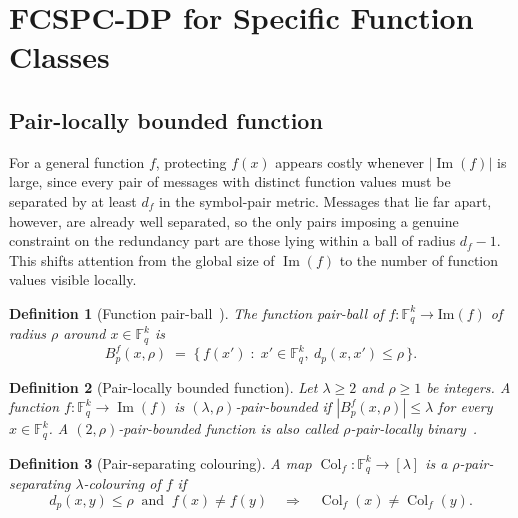 \documentclass[11pt,draftclsnofoot,journal,onecolumn]{IEEEtran}
\newtheorem{definition}{Definition}
\begin{document}
\section{FCSPC-DP for Specific Function Classes }\label{sec:classes}
    \subsection{Pair-locally bounded function}

    For a general function $f$, protecting $f(x)$ appears costly whenever $|\operatorname{Im}(f)|$ is large, since every pair of messages with distinct function values must be separated by at least $d_f$ in the symbol-pair metric. Messages that lie far apart, however, are already well separated, so the only pairs imposing a genuine constraint on the redundancy part are those lying within a ball of radius $d_f-1$. This shifts attention from the global size of $\operatorname{Im}(f)$ to the number of function values visible locally.

    \begin{definition}[Function pair-ball~\cite{xia2024function}]
    \label{def:function-pair-ball}
    The \emph{function pair-ball} of $f : \mathbb{F}_q^k \to \mathrm{Im}(f)$ of radius $\rho$ around $x \in \mathbb{F}_q^k$ is
    \[
        B^f_p(x,\rho) \;=\; \bigl\{\, f(x') \;:\; x' \in \mathbb{F}_q^k,\ d_p(x,x') \le \rho \,\bigr\}.
    \]
    \end{definition}

    \begin{definition}[Pair-locally bounded function]
    \label{def:pair-bounded}
    Let $\lambda \ge 2$ and $\rho \ge 1$ be integers. A function $f : \mathbb{F}_q^k \to \operatorname{Im}(f)$ is \emph{$(\lambda,\rho)$-pair-bounded} if $|B_p^f(x,\rho)| \le \lambda$ for every $x \in \mathbb{F}_q^k$. A $(2,\rho)$-pair-bounded function is also called \emph{$\rho$-pair-locally binary}~\cite{xia2024function}.
    \end{definition}

    \begin{definition}[Pair-separating colouring]
    \label{def:pair-colouring}
    A map $\operatorname{Col}_f : \mathbb{F}_q^k \to [\lambda]$ is a \emph{$\rho$-pair-separating $\lambda$-colouring} of $f$ if
    \[
    d_p(x,y) \le \rho \ \text{ and }\ f(x) \neq f(y)
    \quad\Longrightarrow\quad
    \operatorname{Col}_f(x) \neq \operatorname{Col}_f(y).
    \]
    \end{definition}
\end{document}
